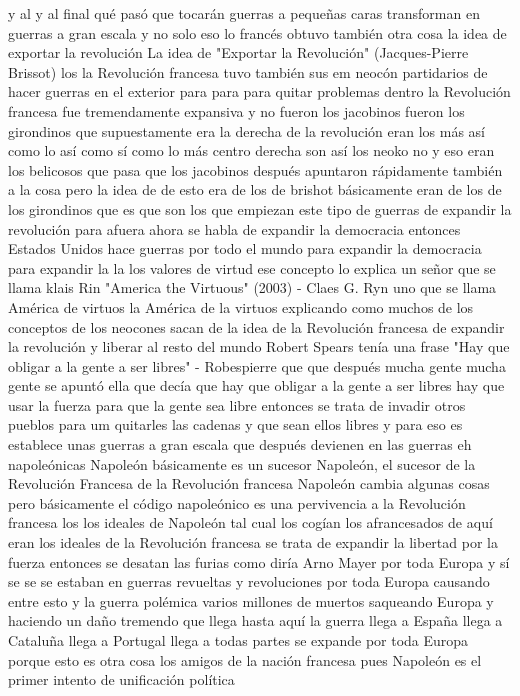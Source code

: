 y al y al final qué pasó que tocarán guerras a pequeñas caras transforman en guerras a gran escala
y no solo eso lo francés obtuvo también otra cosa la idea de exportar la revolución
La idea de "Exportar la Revolución" (Jacques-Pierre Brissot)
los la Revolución francesa tuvo también sus em neocón
partidarios de hacer guerras en el exterior para para para quitar problemas dentro la Revolución francesa fue tremendamente expansiva
y no fueron los jacobinos fueron los girondinos que supuestamente era la derecha
de la revolución eran los más así como lo así como sí como lo más centro derecha son así
los neoko no y eso eran los belicosos que pasa que los jacobinos después apuntaron rápidamente
también a la cosa pero la idea de de esto era de los de brishot básicamente eran de los de los girondinos
que es que son los que empiezan este tipo de guerras de expandir la revolución para afuera ahora se habla de expandir la democracia
entonces Estados Unidos hace guerras por todo el mundo para expandir la democracia para expandir la
la los valores de virtud ese concepto lo explica un señor que se llama klais Rin
"America the Virtuous" (2003) - Claes G. Ryn
uno que se llama América de virtuos la América de la virtuos explicando como muchos de los conceptos de los neocones sacan de la idea de la Revolución francesa
de expandir la revolución y liberar al resto del mundo Robert Spears tenía una frase
"Hay que obligar a la gente a ser libres" - Robespierre
que que después mucha gente mucha gente se apuntó ella que decía que hay que obligar a la gente a ser libres
hay que usar la fuerza para que la gente sea libre entonces se trata de invadir otros pueblos
para um quitarles las cadenas y que sean ellos libres y para eso es establece unas guerras a gran escala
que después devienen en las guerras eh napoleónicas Napoleón básicamente es un sucesor
Napoleón, el sucesor de la Revolución Francesa
de la Revolución francesa Napoleón cambia algunas cosas pero básicamente el código napoleónico es una
pervivencia a la Revolución francesa los los ideales de Napoleón tal cual los cogían los afrancesados de aquí
eran los ideales de la Revolución francesa se trata de expandir la libertad por la fuerza entonces se desatan las furias
como diría Arno Mayer por toda Europa y sí se se se estaban en guerras
revueltas y revoluciones por toda Europa causando entre esto y la guerra polémica varios millones de muertos saqueando Europa y haciendo
un daño tremendo que llega hasta aquí la guerra llega a España llega a Cataluña llega a Portugal llega a todas partes se expande por toda Europa
porque esto es otra cosa los amigos de la nación francesa pues Napoleón es el primer intento de unificación política

